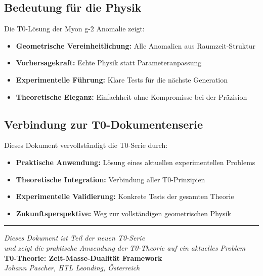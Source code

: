 \documentclass[12pt,a4paper]{article}
\begin{document}
	\subsection{Bedeutung für die Physik}
	
	Die T0-Lösung der Myon g-2 Anomalie zeigt:
	
	\begin{itemize}
		\item \textbf{Geometrische Vereinheitlichung:} Alle Anomalien aus Raumzeit-Struktur
		\item \textbf{Vorhersagekraft:} Echte Physik statt Parameteranpassung
		\item \textbf{Experimentelle Führung:} Klare Tests für die nächste Generation
		\item \textbf{Theoretische Eleganz:} Einfachheit ohne Kompromisse bei der Präzision
	\end{itemize}
	
	\subsection{Verbindung zur T0-Dokumentenserie}
	
	Dieses Dokument vervollständigt die T0-Serie durch:
	
	\begin{itemize}
		\item \textbf{Praktische Anwendung:} Lösung eines aktuellen experimentellen Problems
		\item \textbf{Theoretische Integration:} Verbindung aller T0-Prinzipien
		\item \textbf{Experimentelle Validierung:} Konkrete Tests der gesamten Theorie
		\item \textbf{Zukunftsperspektive:} Weg zur vollständigen geometrischen Physik
	\end{itemize}
	
	\begin{center}
		\hrule
		\vspace{0.5cm}
		\textit{Dieses Dokument ist Teil der neuen T0-Serie}\\
		\textit{und zeigt die praktische Anwendung der T0-Theorie auf ein aktuelles Problem}\\
		\vspace{0.3cm}
		\textbf{T0-Theorie: Zeit-Masse-Dualität Framework}\\
		\textit{Johann Pascher, HTL Leonding, Österreich}\\
	\end{center}
	
\end{document}
